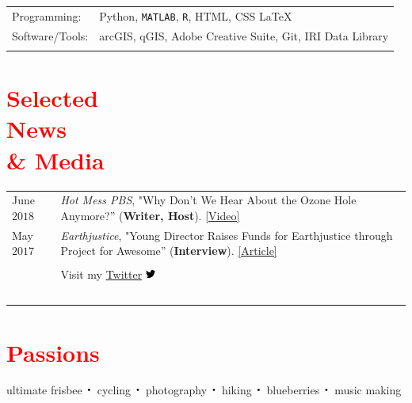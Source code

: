 \documentclass[margin,line,palatino,courier,10pt]{res}
\newcommand*{\bigDot}{\raisebox{-0.25ex}{\scalebox{2.1}{$\cdot$}}}
\begin{document}
\begin{resume}
\begin{tabular}{@{}p{.9in}p{6in}}
Programming:& Python, \texttt{MATLAB}, \texttt{R}, HTML, CSS \LaTeX \\
Software/Tools:&  arcGIS, qGIS, Adobe Creative Suite, Git, IRI Data Library \\\\

\end{tabular}


\section{\sc \textcolor{Red}{\large{Selected  \\News \\ \& Media}}}
\vspace*{0.04in}
\begin{tabular}{@{}p{0.8in}p{4in}}
June $2018$ & \textit{Hot Mess PBS}, "Why Don’t We Hear About the Ozone Hole Anymore?'' (\textbf{Writer, Host}). \href{https://www.youtube.com/watch?v=mQpa_NYXUGI}{[Video]}\\

May $2017$ & \textit{Earthjustice}, "Young Director Raises Funds for Earthjustice through Project for Awesome'' (\textbf{Interview}). \href{http://earthjustice.org/blog/2017-may/director-raises-funds-for-earthjustice-through-project-for-awesome}{[Article]}\\


\\
& Visit my \href{https://twitter.com/zentouro}{Twitter} \includegraphics[height=9pt]{twitter.png}\\\
\end{tabular}

\section{\sc \textcolor{Red}{\large{Passions}}}
ultimate frisbee $\bigDot$ cycling $\bigDot$ photography $\bigDot$ hiking $\bigDot$ blueberries $\bigDot$ music making


\vspace{0.21 in}


\end{resume}
\end{document}
